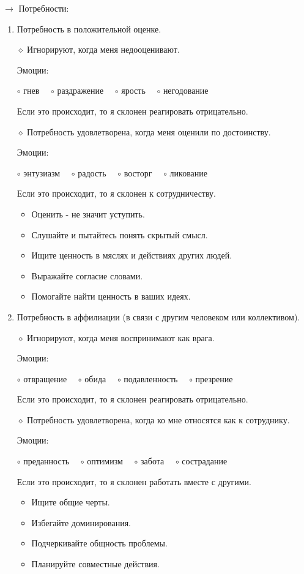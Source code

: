 \documentclass[12pt,a4paper]{report}
\begin{document}
\bigskip
$\rightarrow$ Потребности:
\begin{enumerate}
	\item Потребность в положительной оценке. 
	
	\medskip
	$\diamond$ Игнорируют, когда меня недооценивают.
	
	Эмоции:
	
	$\circ$ гнев~~
	$\circ$ раздражение~~
	$\circ$ ярость~~
	$\circ$ негодование~~
	
	Если это происходит, то я склонен реагировать отрицательно.
	
	\bigskip
	$\diamond$ Потребность удовлетворена, когда меня оценили по достоинству.
	
	Эмоции:
		
	$\circ$ энтузиазм~~
	$\circ$ радость~~
	$\circ$ восторг~~
	$\circ$ ликование~~
	
	Если это происходит, то я склонен к сотрудничеству.
	
	\smallskip
	\begin{itemize}
		\item Оценить - не значит уступить.
		\item Слушайте и пытайтесь понять скрытый смысл.
		\item Ищите ценность в мяслях и действиях других людей.
		\item Выражайте согласие словами.
		\item Помогайте найти ценность в ваших идеях.
	\end{itemize}

	\smallskip
	\item Потребность в аффилиации (в связи с другим человеком или коллективом).
	
	\medskip
	$\diamond$ Игнорируют, когда меня воспринимают как врага.
	
	Эмоции:
	
	$\circ$ отвращение~~
	$\circ$ обида~~
	$\circ$ подавленность~~
	$\circ$ презрение~~
	
	Если это происходит, то я склонен реагировать отрицательно.
	
	\bigskip
	$\diamond$ Потребность удовлетворена, когда ко мне относятся как к сотруднику.
	
	Эмоции:
	
	$\circ$ преданность~~
	$\circ$ оптимизм~~
	$\circ$ забота~~
	$\circ$ сострадание~~
	
	Если это происходит, то я склонен работать вместе с другими.
	
	\smallskip
	\begin{itemize}
		\item Ищите общие черты.
		\item Избегайте доминирования.
		\item Подчеркивайте общность проблемы.
		\item Планируйте совместные действия.
	\end{itemize}


\end{enumerate}
\end{document}
